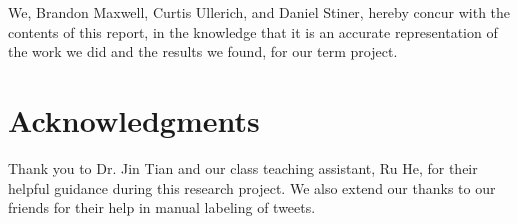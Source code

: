 \documentclass[letterpaper]{article}
\begin{document}
We, Brandon Maxwell, Curtis Ullerich, and Daniel Stiner, hereby concur with the contents of this report, in the knowledge that it is an accurate representation of the work we did and the results we found, for our term project.

\section{ Acknowledgments}
Thank you to Dr. Jin Tian and our class teaching assistant, Ru He, for their helpful guidance during this research project. We also extend our thanks to our friends for their help in manual labeling of tweets.





\end{document}

